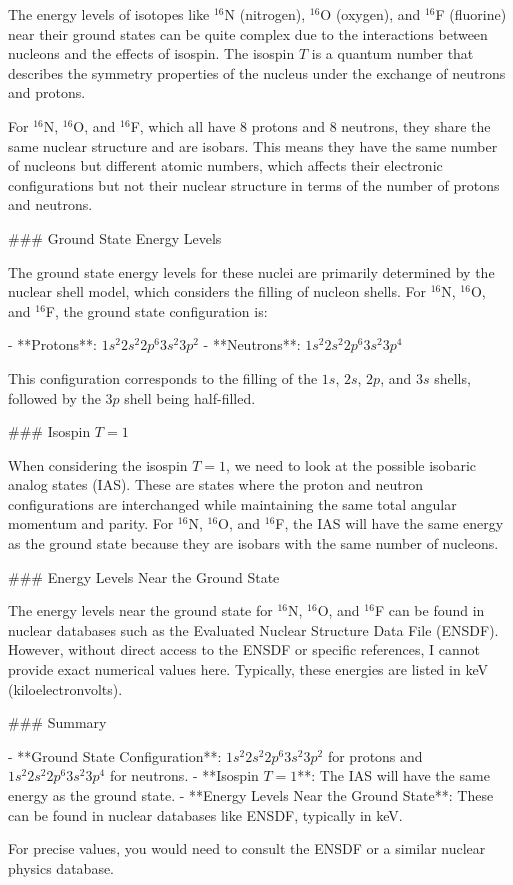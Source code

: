 The energy levels of isotopes like \(^{16}\)N (nitrogen), \(^{16}\)O (oxygen), and \(^{16}\)F (fluorine) near their ground states can be quite complex due to the interactions between nucleons and the effects of isospin. The isospin \(T\) is a quantum number that describes the symmetry properties of the nucleus under the exchange of neutrons and protons.

For \(^{16}\)N, \(^{16}\)O, and \(^{16}\)F, which all have 8 protons and 8 neutrons, they share the same nuclear structure and are isobars. This means they have the same number of nucleons but different atomic numbers, which affects their electronic configurations but not their nuclear structure in terms of the number of protons and neutrons.

### Ground State Energy Levels

The ground state energy levels for these nuclei are primarily determined by the nuclear shell model, which considers the filling of nucleon shells. For \(^{16}\)N, \(^{16}\)O, and \(^{16}\)F, the ground state configuration is:

- **Protons**: \(1s^2 2s^2 2p^6 3s^2 3p^2\)
- **Neutrons**: \(1s^2 2s^2 2p^6 3s^2 3p^4\)

This configuration corresponds to the filling of the \(1s\), \(2s\), \(2p\), and \(3s\) shells, followed by the \(3p\) shell being half-filled.

### Isospin \(T = 1\)

When considering the isospin \(T = 1\), we need to look at the possible isobaric analog states (IAS). These are states where the proton and neutron configurations are interchanged while maintaining the same total angular momentum and parity. For \(^{16}\)N, \(^{16}\)O, and \(^{16}\)F, the IAS will have the same energy as the ground state because they are isobars with the same number of nucleons.

### Energy Levels Near the Ground State

The energy levels near the ground state for \(^{16}\)N, \(^{16}\)O, and \(^{16}\)F can be found in nuclear databases such as the Evaluated Nuclear Structure Data File (ENSDF). However, without direct access to the ENSDF or specific references, I cannot provide exact numerical values here. Typically, these energies are listed in keV (kiloelectronvolts).

### Summary

- **Ground State Configuration**: \(1s^2 2s^2 2p^6 3s^2 3p^2\) for protons and \(1s^2 2s^2 2p^6 3s^2 3p^4\) for neutrons.
- **Isospin \(T = 1\)**: The IAS will have the same energy as the ground state.
- **Energy Levels Near the Ground State**: These can be found in nuclear databases like ENSDF, typically in keV.

For precise values, you would need to consult the ENSDF or a similar nuclear physics database.